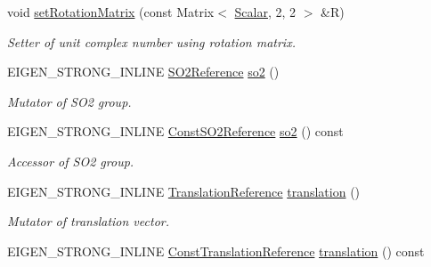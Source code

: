 \begin{DoxyCompactItemize}
void \hyperlink{class_sophus_1_1_s_e2_group_base_a1d428f01714ff3e3f3df348913645c9b}{set\+Rotation\+Matrix} (const Matrix$<$ \hyperlink{class_sophus_1_1_s_e2_group_base_a1bad7970c24437df7f4a34281ff147fe}{Scalar}, 2, 2 $>$ \&R)
\begin{DoxyCompactList}\small\item\em Setter of unit complex number using rotation matrix. \end{DoxyCompactList}\item 
E\+I\+G\+E\+N\+\_\+\+S\+T\+R\+O\+N\+G\+\_\+\+I\+N\+L\+I\+NE \hyperlink{class_sophus_1_1_s_e2_group_base_a057dc5e957e17fa3357cf1d2ae800c77}{S\+O2\+Reference} \hyperlink{class_sophus_1_1_s_e2_group_base_a7c687ab374c54c578857e3ed03d64e94}{so2} ()\hypertarget{class_sophus_1_1_s_e2_group_base_a7c687ab374c54c578857e3ed03d64e94}{}\label{class_sophus_1_1_s_e2_group_base_a7c687ab374c54c578857e3ed03d64e94}

\begin{DoxyCompactList}\small\item\em Mutator of S\+O2 group. \end{DoxyCompactList}\item 
E\+I\+G\+E\+N\+\_\+\+S\+T\+R\+O\+N\+G\+\_\+\+I\+N\+L\+I\+NE \hyperlink{class_sophus_1_1_s_e2_group_base_a261f36c0d0c957dc49ca5f586c32e3a2}{Const\+S\+O2\+Reference} \hyperlink{class_sophus_1_1_s_e2_group_base_ac644101eacda42115dfb3fecd5bc5eca}{so2} () const \hypertarget{class_sophus_1_1_s_e2_group_base_ac644101eacda42115dfb3fecd5bc5eca}{}\label{class_sophus_1_1_s_e2_group_base_ac644101eacda42115dfb3fecd5bc5eca}

\begin{DoxyCompactList}\small\item\em Accessor of S\+O2 group. \end{DoxyCompactList}\item 
E\+I\+G\+E\+N\+\_\+\+S\+T\+R\+O\+N\+G\+\_\+\+I\+N\+L\+I\+NE \hyperlink{class_sophus_1_1_s_e2_group_base_a971b396ee82cd53a8518bd7d6f216102}{Translation\+Reference} \hyperlink{class_sophus_1_1_s_e2_group_base_aebf12d78f613797ebfbefdd475ca0c6d}{translation} ()\hypertarget{class_sophus_1_1_s_e2_group_base_aebf12d78f613797ebfbefdd475ca0c6d}{}\label{class_sophus_1_1_s_e2_group_base_aebf12d78f613797ebfbefdd475ca0c6d}

\begin{DoxyCompactList}\small\item\em Mutator of translation vector. \end{DoxyCompactList}\item 
E\+I\+G\+E\+N\+\_\+\+S\+T\+R\+O\+N\+G\+\_\+\+I\+N\+L\+I\+NE \hyperlink{class_sophus_1_1_s_e2_group_base_a5fbd917de2097049af437e580f3163a3}{Const\+Translation\+Reference} \hyperlink{class_sophus_1_1_s_e2_group_base_a5a17942302897237f35657a7133fe8de}{translation} () const \hypertarget{class_sophus_1_1_s_e2_group_base_a5a17942302897237f35657a7133fe8de}{}\label{class_sophus_1_1_s_e2_group_base_a5a17942302897237f35657a7133fe8de}


\end{DoxyCompactItemize}
